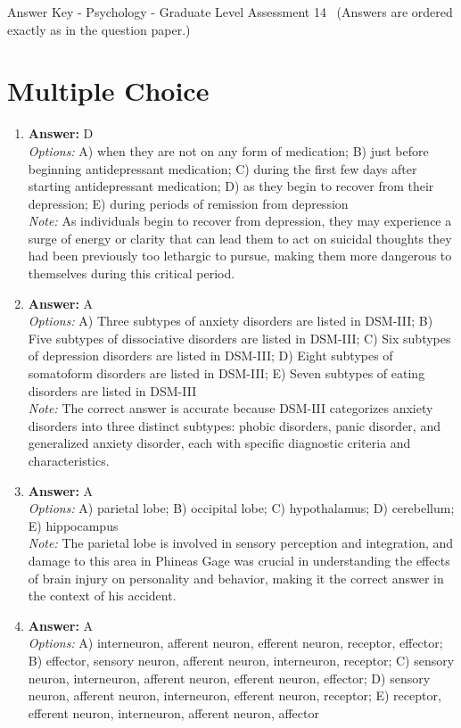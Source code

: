 \documentclass[12pt]{article}
\begin{document}
\begin{center}
Answer Key - Psychology - Graduate Level Assessment 14 \
\small (Answers are ordered exactly as in the question paper.)
\end{center}

\section*{Multiple Choice}
\begin{enumerate}[label=\arabic*.]
\item \textbf{Answer:} D
\\ \textit{Options:} A) when they are not on any form of medication; B) just before beginning antidepressant medication; C) during the first few days after starting antidepressant medication; D) as they begin to recover from their depression; E) during periods of remission from depression
\\ \textit{Note:} As individuals begin to recover from depression, they may experience a surge of energy or clarity that can lead them to act on suicidal thoughts they had been previously too lethargic to pursue, making them more dangerous to themselves during this critical period.
\item \textbf{Answer:} A
\\ \textit{Options:} A) Three subtypes of anxiety disorders are listed in DSM-III; B) Five subtypes of dissociative disorders are listed in DSM-III; C) Six subtypes of depression disorders are listed in DSM-III; D) Eight subtypes of somatoform disorders are listed in DSM-III; E) Seven subtypes of eating disorders are listed in DSM-III
\\ \textit{Note:} The correct answer is accurate because DSM-III categorizes anxiety disorders into three distinct subtypes: phobic disorders, panic disorder, and generalized anxiety disorder, each with specific diagnostic criteria and characteristics.
\item \textbf{Answer:} A
\\ \textit{Options:} A) parietal lobe; B) occipital lobe; C) hypothalamus; D) cerebellum; E) hippocampus
\\ \textit{Note:} The parietal lobe is involved in sensory perception and integration, and damage to this area in Phineas Gage was crucial in understanding the effects of brain injury on personality and behavior, making it the correct answer in the context of his accident.
\item \textbf{Answer:} A
\\ \textit{Options:} A) interneuron, afferent neuron, efferent neuron, receptor, effector; B) effector, sensory neuron, afferent neuron, interneuron, receptor; C) sensory neuron, interneuron, afferent neuron, efferent neuron, effector; D) sensory neuron, afferent neuron, interneuron, efferent neuron, receptor; E) receptor, efferent neuron, interneuron, afferent neuron, affector

\end{enumerate}
\end{document}
